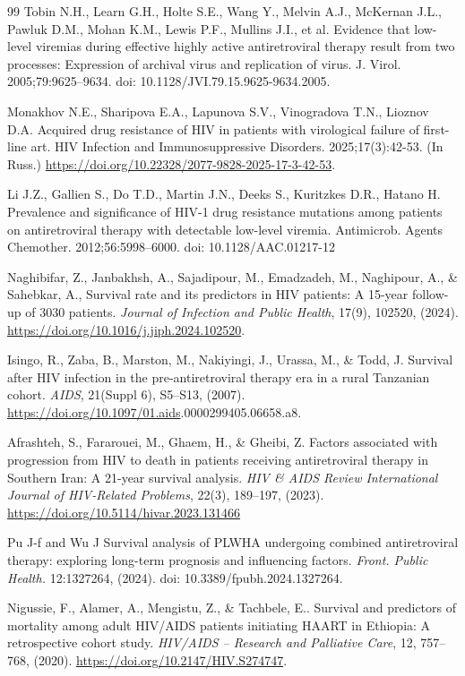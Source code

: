 \documentclass[10pt]{NSP1}
\begin{document}
\begin{thebibliography}{99}
Tobin N.H., Learn G.H., Holte S.E., Wang Y., Melvin A.J., McKernan J.L., Pawluk D.M., Mohan K.M., Lewis P.F., Mullins J.I., et al. Evidence that low-level viremias during effective highly active antiretroviral therapy result from two processes: Expression of archival virus and replication of virus. J. Virol. 2005;79:9625–9634. doi: 10.1128/JVI.79.15.9625-9634.2005. 

Monakhov N.E., Sharipova E.A., Lapunova S.V., Vinogradova T.N., Lioznov D.A. Acquired drug resistance of HIV in patients with virological failure of first-line art. HIV Infection and Immunosuppressive Disorders. 2025;17(3):42-53. (In Russ.) \url{https://doi.org/10.22328/2077-9828-2025-17-3-42-53}.

Li J.Z., Gallien S., Do T.D., Martin J.N., Deeks S., Kuritzkes D.R., Hatano H. Prevalence and significance of HIV-1 drug resistance mutations among patients on antiretroviral therapy with detectable low-level viremia. Antimicrob. Agents Chemother. 2012;56:5998–6000. doi: 10.1128/AAC.01217-12

Naghibifar, Z., Janbakhsh, A., Sajadipour, M., Emadzadeh, M., Naghipour, A., \& Sahebkar, A., Survival rate and its predictors in HIV patients: A 15-year follow-up of 3030 patients. \textit{Journal of Infection and Public Health}, 17(9), 102520, (2024). \url{https://doi.org/10.1016/j.jiph.2024.102520}.

Isingo, R., Zaba, B., Marston, M., Nakiyingi, J., Urassa, M., \& Todd, J. Survival after HIV infection in the pre-antiretroviral therapy era in a rural Tanzanian cohort. \textit{AIDS}, 21(Suppl 6), S5–S13, (2007). \url{https://doi.org/10.1097/01.aids}.0000299405.06658.a8.

Afrashteh, S., Fararouei, M., Ghaem, H., \& Gheibi, Z. Factors associated with progression from HIV to death in patients receiving antiretroviral therapy in Southern Iran: A 21-year survival analysis. \textit{HIV \& AIDS Review International Journal of HIV-Related Problems}, 22(3), 189–197, (2023). \url{https://doi.org/10.5114/hivar.2023.131466}

Pu J-f and Wu J Survival analysis of PLWHA undergoing combined antiretroviral therapy: exploring long-term prognosis and influencing factors. \textit{Front. Public Health.} 12:1327264, (2024). doi: 10.3389/fpubh.2024.1327264.

Nigussie, F., Alamer, A., Mengistu, Z., \& Tachbele, E.. Survival and predictors of mortality among adult HIV/AIDS patients initiating HAART in Ethiopia: A retrospective cohort study. \textit{HIV/AIDS – Research and Palliative Care}, 12, 757–768, (2020). \url{https://doi.org/10.2147/HIV.S274747}.


\end{thebibliography}
\end{document}
